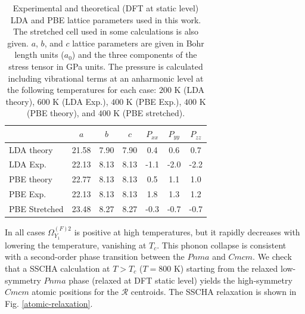 \begin{table}
\begin{center}
\begin{tabular*}{0.65\textwidth}{l c c c c c c}
 \hline
 \hline
            & $a$  & $b$  & $c$  & $P_{xx}$ & $P_{yy}$ & $P_{zz}$ \\
 \hline
 LDA theory                  &  21.58  &  7.90  & 7.90  &  0.4  &  0.6  &  0.7  \\
 LDA Exp.                    &  22.13  &  8.13  & 8.13  & -1.1  & -2.0  & -2.2  \\
 PBE theory                  &  22.77  &  8.13  & 8.13  &  0.5  &  1.1  &  1.0  \\
 PBE Exp.                    &  22.13  &  8.13  & 8.13  &  1.8  &  1.3  &  1.2  \\
 PBE Stretched               &  23.48  &  8.27  & 8.27  & -0.3  & -0.7  & -0.7  \\
 \hline
 \hline
\end{tabular*}
\end{center}
\caption[Experimental and theoretical lattice parameters of $Cmcm$ SnSe]{Experimental\cite{zhao2014ultralow} and 
	theoretical (DFT at static level) LDA and PBE lattice parameters used in this work. The stretched cell used 
	in some calculations is also given. $a$, $b$, and $c$ lattice parameters are given in Bohr length units 
	($a_0$) and the three components of the stress tensor in GPa units. The pressure is calculated including 
	vibrational terms at an anharmonic level at the following temperatures for each case: $200$ K (LDA theory), 
	$600$ K (LDA Exp.), $400$ K (PBE Exp.), $400$ K (PBE theory), and $400$ K (PBE stretched).}
\label{cell-parameters}
\end{table}
In all cases $\Omega^{(F)2}_{Y_{1}}$ is positive at high temperatures, but it rapidly decreases with lowering the temperature, vanishing at $T_{c}$. This phonon collapse is consistent with a second-order phase transition between
the $Pnma$ and $Cmcm$. We check that a SSCHA calculation at $T>T_{c}$ ($T=800$ K) starting from the relaxed low-symmetry $Pnma$ phase (relaxed at DFT static level) yields the high-symmetry $Cmcm$ atomic positions for the 
$\boldsymbol{\mathcal{R}}$ centroids. The SSCHA relaxation is shown in Fig. \ref{atomic-relaxation}.
